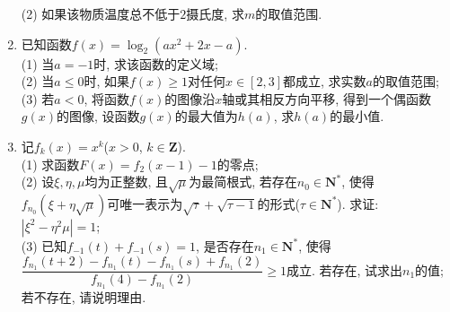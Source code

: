 \documentclass[10pt,a4paper]{article}
\begin{document}
\begin{enumerate}[1.]
(2) 如果该物质温度总不低于$2$摄氏度, 求$m$的取值范围.
\item 已知函数$f(x)=\log_2(a x^2+2x-a)$.\\
(1) 当$a=-1$时, 求该函数的定义域;\\
(2) 当$a\le 0$时, 如果$f(x)\ge 1$对任何$x\in [2,3]$都成立, 求实数$a$的取值范围;\\
(3) 若$a<0$, 将函数$f(x)$的图像沿$x$轴或其相反方向平移, 得到一个偶函数$g(x)$的图像, 设函数$g(x)$的最大值为$h(a)$, 求$h(a)$的最小值.
\item 记$f_k(x)=x^k$($x>0$, $k\in \mathbf{Z}$).\\
(1) 求函数$F(x)=f_2(x-1)-1$的零点;\\
(2) 设$\xi,\eta,\mu$均为正整数, 且$\sqrt{\mu}$为最简根式, 若存在$n_0\in \mathbf{N}^*$, 使得$f_{n_0}(\xi+\eta\sqrt{\mu})$可唯一表示为$\sqrt{\tau}+\sqrt{\tau-1}$的形式($\tau\in\mathbf{N}^*$). 求证: $|\xi^2-\eta^2\mu|=1$;\\
(3) 已知$f_{-1}(t)+f_{-1}(s)=1$, 是否存在$n_1\in \mathbf{N}^*$, 使得$\dfrac{f_{n_1}(t+2)-f_{n_1}(t)-f_{n_1}(s)+f_{n_1}(2)}{f_{n_1}(4)-f_{n_1}(2)}\ge 1$成立. 若存在, 试求出$n_1$的值; 若不存在, 请说明理由.


\end{enumerate}
\end{document}

